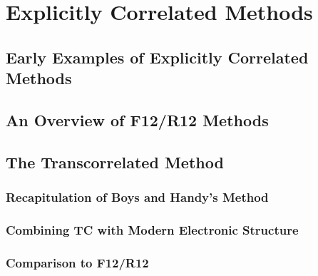 \chapter{Explicitly Correlated Methods}
\label{chap:explicit}

\section{Early Examples of Explicitly Correlated Methods}


\section{An Overview of F12/R12 Methods}


\section{The Transcorrelated Method}


\subsection{Recapitulation of Boys and Handy's Method}

\subsection{Combining TC with Modern Electronic Structure}

\subsection{Comparison to F12/R12}
